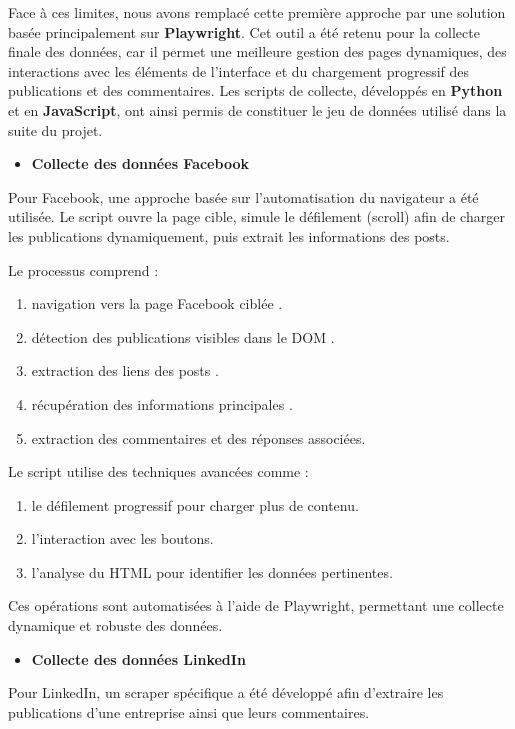 \documentclass[12pt,a4paper,oneside]{report}
\begin{document}
Face à ces limites, nous avons remplacé cette première approche par une solution basée principalement sur \textbf{Playwright}. Cet outil a été retenu pour la collecte finale des données, car il permet une meilleure gestion des pages dynamiques, des interactions avec les éléments de l’interface et du chargement progressif des publications et des commentaires. Les scripts de collecte, développés en \textbf{Python} et en \textbf{JavaScript}, ont ainsi permis de constituer le jeu de données utilisé dans la suite du projet.

\begin{itemize}
    \item \textbf{Collecte des données Facebook}
\end{itemize}
Pour Facebook, une approche basée sur l’automatisation du navigateur a été utilisée. Le script ouvre la page cible, simule le défilement (scroll) afin de charger les publications dynamiquement, puis extrait les informations des posts.

Le processus comprend :
\begin{enumerate}
    \item navigation vers la page Facebook ciblée .
    \item détection des publications visibles dans le DOM .
    \item extraction des liens des posts .
    \item récupération des informations principales .
    \item extraction des commentaires et des réponses associées.
\end{enumerate}
Le script utilise des techniques avancées comme :
\begin{enumerate}
    \item le défilement progressif pour charger plus de contenu.
    \item l’interaction avec les boutons.
    \item l’analyse du HTML pour identifier les données pertinentes.
\end{enumerate}
Ces opérations sont automatisées à l’aide de Playwright, permettant une collecte dynamique et robuste des données.

\begin{itemize}
    \item \textbf{Collecte des données LinkedIn}
\end{itemize}
Pour LinkedIn, un scraper spécifique a été développé afin d’extraire les publications d’une entreprise ainsi que leurs commentaires.
\end{document}
